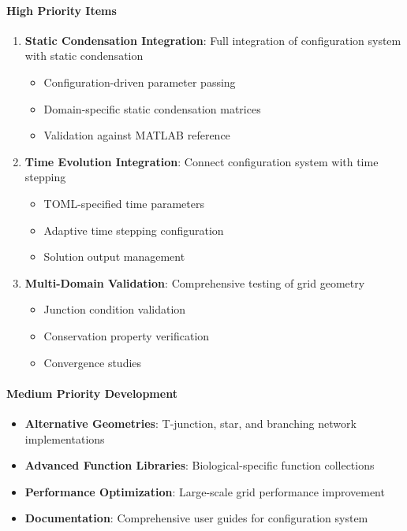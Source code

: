 \paragraph{High Priority Items}
\begin{enumerate}
    \item \textbf{Static Condensation Integration}: Full integration of configuration system with static condensation
    \begin{itemize}
        \item Configuration-driven parameter passing
        \item Domain-specific static condensation matrices
        \item Validation against MATLAB reference
    \end{itemize}
    
    \item \textbf{Time Evolution Integration}: Connect configuration system with time stepping
    \begin{itemize}
        \item TOML-specified time parameters
        \item Adaptive time stepping configuration
        \item Solution output management
    \end{itemize}
    
    \item \textbf{Multi-Domain Validation}: Comprehensive testing of grid geometry
    \begin{itemize}
        \item Junction condition validation
        \item Conservation property verification
        \item Convergence studies
    \end{itemize}
\end{enumerate}

\paragraph{Medium Priority Development}
\begin{itemize}
    \item \textbf{Alternative Geometries}: T-junction, star, and branching network implementations
    \item \textbf{Advanced Function Libraries}: Biological-specific function collections
    \item \textbf{Performance Optimization}: Large-scale grid performance improvement
    \item \textbf{Documentation}: Comprehensive user guides for configuration system
\end{itemize}

